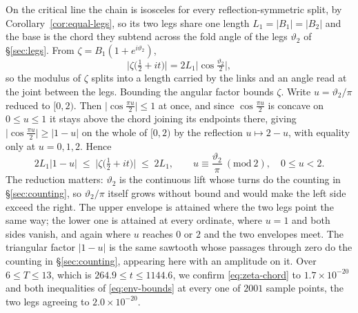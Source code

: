 \documentclass[11pt]{article}
\theoremstyle{definition}
\begin{document}
On the critical line the chain is isosceles for every reflection-symmetric
split, by Corollary~\ref{cor:equal-legs}, so its two legs share one length
$L_1=|B_1|=|B_2|$ and the base is the chord they subtend across the fold
angle of the legs $\vartheta_2$ of \S\ref{sec:legs}. From $\zeta=B_1(1+e^{i\vartheta_2})$,
\begin{equation}\label{eq:zeta-chord}
\bigl|\zeta\bigl(\tfrac12+it\bigr)\bigr|
=2L_1\bigl|\cos\tfrac{\vartheta_2}{2}\bigr| ,
\end{equation}
so the modulus of $\zeta$ splits into a length carried by the links and an angle
read at the joint between the legs. Bounding the angular factor bounds $\zeta$.
Write $u=\vartheta_2/\pi$ reduced to $[0,2)$. Then
$\bigl|\cos\tfrac{\pi u}{2}\bigr|\leq1$ at once, and since
$\cos\tfrac{\pi u}{2}$ is concave on $0\leq u\leq1$ it stays above the chord
joining its endpoints there, giving
$\bigl|\cos\tfrac{\pi u}{2}\bigr|\geq|1-u|$ on the whole of $[0,2)$ by the
reflection $u\mapsto2-u$, with equality only at $u=0,1,2$. Hence
\begin{equation}\label{eq:env-bounds}
2L_1\bigl|1-u\bigr|
\;\leq\;\bigl|\zeta\bigl(\tfrac12+it\bigr)\bigr|\;\leq\;2L_1 ,
\qquad
u\equiv\frac{\vartheta_2}{\pi}\ (\mathrm{mod}\ 2),\quad 0\leq u<2 .
\end{equation}
The reduction matters: $\vartheta_2$ is the continuous lift whose turns do the
counting in \S\ref{sec:counting}, so $\vartheta_2/\pi$ itself grows without
bound and would make the left side exceed the right.
The upper envelope is attained where the two legs point the same way; the
lower one is attained at every ordinate, where
$u=1$ and both sides vanish, and again where $u$ reaches $0$ or $2$ and the two
envelopes meet. The triangular factor $|1-u|$ is the same sawtooth
whose passages through zero do the counting in \S\ref{sec:counting}, appearing
here with an amplitude on it. Over $6\leq T\leq13$, which is
$264.9\leq t\leq1144.6$, we confirm \eqref{eq:zeta-chord} to
$1.7\times10^{-20}$ and both inequalities of \eqref{eq:env-bounds} at every one
of $2001$ sample points, the two legs agreeing to $2.0\times10^{-20}$.
\end{document}
